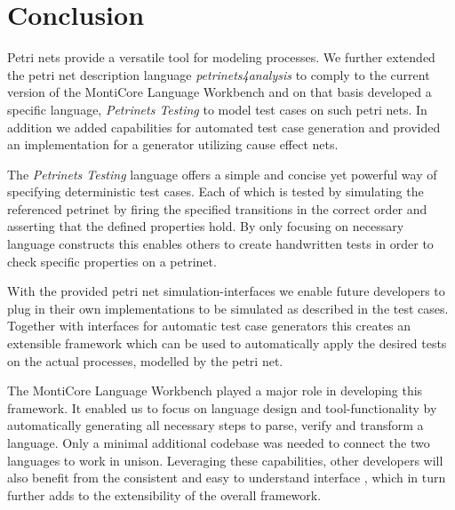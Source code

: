 
\section{Conclusion}

Petri nets provide a versatile tool for modeling processes.
We further extended the petri net description language \emph{petrinets4analysis} to comply to the current version of the MontiCore  Language Workbench and on that basis developed a specific language, \emph{Petrinets Testing} to model test cases on such petri nets.
In addition we added capabilities for automated test case generation and provided an implementation for a generator utilizing cause effect nets.

The \emph{Petrinets Testing} language offers a simple and concise yet powerful way of specifying deterministic test cases. Each of which is tested by simulating the referenced petrinet by firing the specified transitions in the correct order and asserting that the defined properties hold.
By only focusing on necessary language constructs this enables others to create handwritten tests in order to check specific properties on a petrinet.

With the provided petri net simulation-interfaces we enable future developers to plug in their own implementations to be simulated as described in the test cases. Together with interfaces for automatic test case generators this creates an extensible framework which can be used to automatically apply the desired tests on the actual processes, modelled by the petri net.

The MontiCore Language Workbench \cite{rumpe2017monticore} played a major role in developing this framework.
It enabled us to focus on language design and tool-functionality by automatically generating all necessary steps to parse, verify and transform a language. Only a minimal additional codebase was needed to connect the two languages to work in unison.
Leveraging these capabilities, other developers will also benefit from the consistent and easy to understand interface , which in turn further adds to the extensibility of the overall framework.
